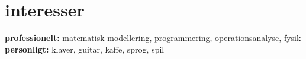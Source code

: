 \documentclass[]{../friggeri-cv} %
\begin{document}

\section{interesser}
\textbf{professionelt:} matematisk modellering, programmering,  operationsanalyse,  fysik
\textbf{personligt:} klaver, guitar, kaffe, sprog, spil

%
%
%
%
%
%

\end{document}
